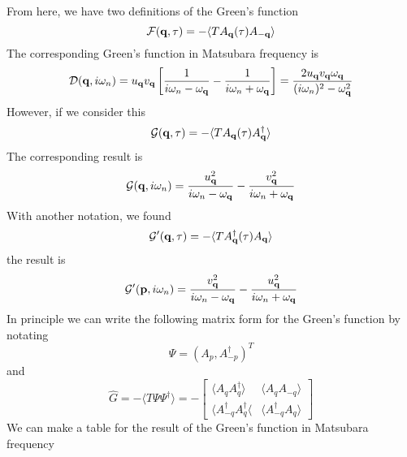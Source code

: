 From here, we have two definitions of the Green's function
\begin{equation}
  \mathcal{F}(\mathbf{q},\tau) = -\langle T A_{\mathbf{q}}(\tau) A_{-\mathbf{q}} \rangle \label{eq:N_Green_tau}
\end{equation}
The corresponding Green's function in Matsubara frequency is
\begin{equation}
  \mathcal{D}(\mathbf{q},i\omega_n) =u_{\mathbf{q}} v_{\mathbf{q}} \left[ \frac{1}{i\omega_n-\omega_{\mathbf{q}}} - \frac{1}{i\omega_n + \omega_{\mathbf{q}}} \right]= \frac{2 u_{\mathbf{q}} v_{\mathbf{q}} \omega_{\mathbf{q}}}{(i\omega_n)^2 -\omega_{\mathbf{q}}^2}  \label{eq:N_Green}
\end{equation}
However, if we consider this
\begin{equation}
  \mathcal{G}(\mathbf{q},\tau) = - \langle T A_{\mathbf{q}}(\tau) A_{\mathbf{q}}^\dagger \rangle \label{eq:F_Green_tau}
\end{equation}
The corresponding result is
\begin{equation}
  \mathcal{G}(\mathbf{q},i\omega_n) = \frac{u_{\mathbf{q}}^2}{i\omega_n - \omega_{\mathbf{q}}} - \frac{v_{\mathbf{q}}^2}{i\omega_n + \omega_{\mathbf{q}}} \label{eq:F_Green}
\end{equation}
With another notation, we found
\begin{equation}
  \mathcal{G}'(\mathbf{q},\tau) = -\langle T A^\dagger_{\mathbf{q}}(\tau)A_{\mathbf{q}} \rangle \label{eq:F_Green2_tau}
\end{equation}
the result is
\begin{equation}
  \mathcal{G}'(\mathbf{p},i\omega_n) = \frac{v^2_{\mathbf{q}}}{i\omega_n-\omega_{\mathbf{q}}} - \frac{u_{\mathbf{q}}^2}{i\omega_n + \omega_{\mathbf{q}}} \label{eq:F_Green2}
\end{equation}
In principle we can write the following matrix form for the Green's function by notating
\begin{equation}
    \Psi = ( A_p,  A_{-p}^\dagger )^T
\end{equation}
and
\begin{equation}
    \hat{G} = -\langle T\Psi \Psi^\dagger \rangle
    = -
    \begin{bmatrix}
        \langle A_q A_{q}^\dagger \rangle & \langle A_q A_{-q} \rangle \\
        \langle A_{-q}^\dagger A_q^\dagger \langle & \langle A^\dagger_{-q} A_q\rangle
    \end{bmatrix}
\end{equation}
We can make a table for the result of the Green's function in Matsubara frequency

